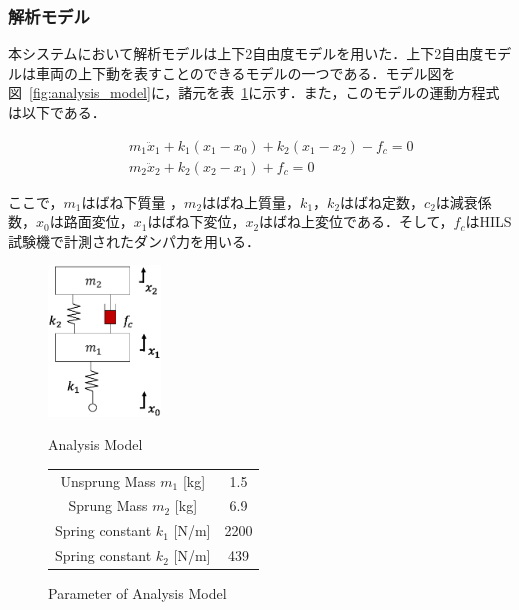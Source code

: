 \documentclass[a4paper,12pt]{article_vdlab_sotsuron}
\begin{document}
\newpage
\subsubsection{解析モデル}
本システムにおいて解析モデルは上下2自由度モデルを用いた．上下2自由度モデルは車両の上下動を表すことのできるモデルの一つである\cite{carbody_model}．モデル図を図~\ref{fig:analysis_model}に，諸元を表~\ref{tab:carbody_parameter}に示す．また，このモデルの運動方程式は以下である．

\begin{eqnarray}
 \label{eq:2dof_m1} &&m_1\ddot x_1 + k_1(x_1-x_0) + k_2(x_1-x_2) - f_c = 0\\
 \label{eq:2dof_m2} &&m_2\ddot x_2 + k_2(x_2-x_1) + f_c = 0
\end{eqnarray}

\vspace{10mm}
ここで，$m_1$はばね下質量 ，$m_2$はばね上質量，$k_1$，$k_2$はばね定数，$c_2$は減衰係数，$x_0$は路面変位，$x_1$はばね下変位，$x_2$はばね上変位である．そして，$f_c$はHILS試験機で計測されたダンパ力を用いる．

\vspace*{10mm}
\begin{figure}[htp]
  \begin{minipage}{0.5\textwidth}
    \begin{center}
      \includegraphics[height=40mm]{figure/analysis_model.eps}
      \vspace*{3mm}
      \caption{Analysis Model}
      \label{fig:analysis_model}
    \end{center}
  \end{minipage}
  \begin{minipage}{0.5\textwidth}
      \begin{center}
	\makeatletter
	\def\@captype{table}
	\makeatother
	\caption{Parameter of Analysis Model}
	\label{tab:carbody_parameter}
	  \begin{tabular}{cc}\hline
	    Unsprung Mass $m_1$ [kg] & 1.5\\
	    Sprung Mass $m_2$ [kg] & 6.9\\
	    Spring constant $k_1$ [N/m] & 2200\\
	    Spring constant $k_2$ [N/m] & 439\\\hline
	  \end{tabular}
	\end{center}
  \end{minipage}
\end{figure}
\end{document}
